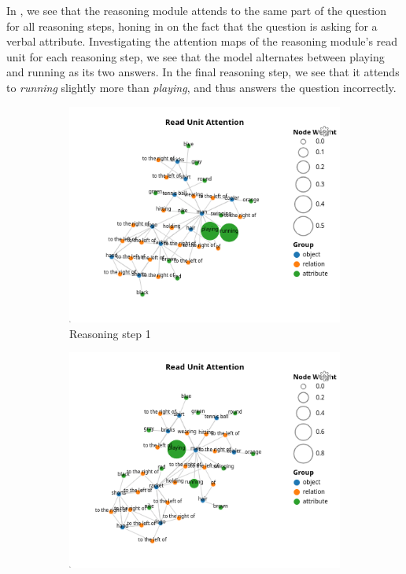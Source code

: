 In \figureautorefname{ \ref{fig:negative_ambiguous_control_attn}}, we see that the reasoning module attends to the same part of the question for all reasoning steps, honing in on the fact that the question is asking for a verbal attribute. Investigating the attention maps of the reasoning module's read unit for each reasoning step, we see that the model alternates between playing and running as its two answers. In the final reasoning step, we see that it attends to \textit{running} slightly more than \textit{playing}, and thus answers the question incorrectly.

\begin{figure}[htbp]
    \centering
    \begin{subfigure}[l]{0.49\textwidth}
        \includegraphics[width=\textwidth]{figures/negative_ambiguous/negative_ambiguous_read_attn_0.png}
        \caption{Reasoning step 1}
    \end{subfigure}
    \begin{subfigure}[r]{0.49\textwidth}
        \includegraphics[width=\textwidth]{figures/negative_ambiguous/negative_ambiguous_read_attn_1.png}

\end{subfigure}
\end{figure}
